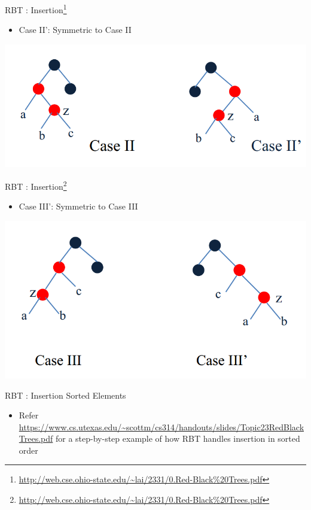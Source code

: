 \documentclass{beamer}
\begin{document}
\begin{frame}{RBT : Insertion\footnote{\url{http://web.cse.ohio-state.edu/~lai/2331/0.Red-Black\%20Trees.pdf}}}
    \begin{itemize}
        \item Case II': Symmetric to Case II
    \end{itemize}
    \begin{center}
        \includegraphics[scale=0.4]{rbtInsertEg4.png}
    \end{center}
\end{frame}


\begin{frame}{RBT : Insertion\footnote{\url{http://web.cse.ohio-state.edu/~lai/2331/0.Red-Black\%20Trees.pdf}}}
    \begin{itemize}
        \item Case III': Symmetric to Case III
    \end{itemize}
    \begin{center}
        \includegraphics[scale=0.4]{rbtInsertEg5.png}
    \end{center}
\end{frame}

\begin{frame}{RBT : Insertion Sorted Elements}
    \begin{itemize}
        \item Refer \url{https://www.cs.utexas.edu/~scottm/cs314/handouts/slides/Topic23RedBlackTrees.pdf} for a step-by-step example of how RBT handles insertion in sorted order
    \end{itemize}
\end{frame}
\end{document}
